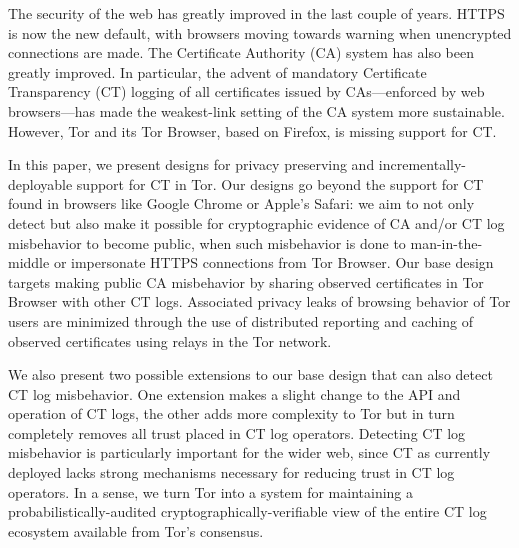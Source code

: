 The security of the web has greatly improved in the last couple of years. HTTPS
is now the new default, with browsers moving towards warning when unencrypted
connections are made. The Certificate Authority (CA) system has also been
greatly improved. In particular, the advent of mandatory Certificate
Transparency (CT) logging of all certificates issued by CAs---enforced by web
browsers---has made the weakest-link setting of the CA system more sustainable.
However, Tor and its Tor Browser, based on Firefox, is missing support for CT.

In this paper, we present designs for privacy preserving and
incrementally-deployable support for CT in Tor. Our designs go beyond the
support for CT found in browsers like Google Chrome or Apple's Safari: we aim to
not only detect but also make it possible for cryptographic evidence of CA
and/or CT log misbehavior to become public, when such misbehavior is done to
man-in-the-middle or impersonate HTTPS connections from Tor Browser. Our base
design targets making public CA misbehavior by sharing observed certificates in
Tor Browser with other CT logs. Associated privacy leaks of browsing behavior of
Tor users are minimized through the use of distributed reporting and caching of
observed certificates using relays in the Tor network.

We also present two possible extensions to our base design that can also detect
CT log misbehavior. One extension makes a slight change to the API and operation
of CT logs, the other adds more complexity to Tor but in turn completely removes
all trust placed in CT log operators. Detecting CT log misbehavior is
particularly important for the wider web, since CT as currently deployed lacks
strong mechanisms necessary for reducing trust in CT log operators. In a sense,
we turn Tor into a system for maintaining a probabilistically-audited
cryptographically-verifiable view of the entire CT log ecosystem available from
Tor’s consensus.